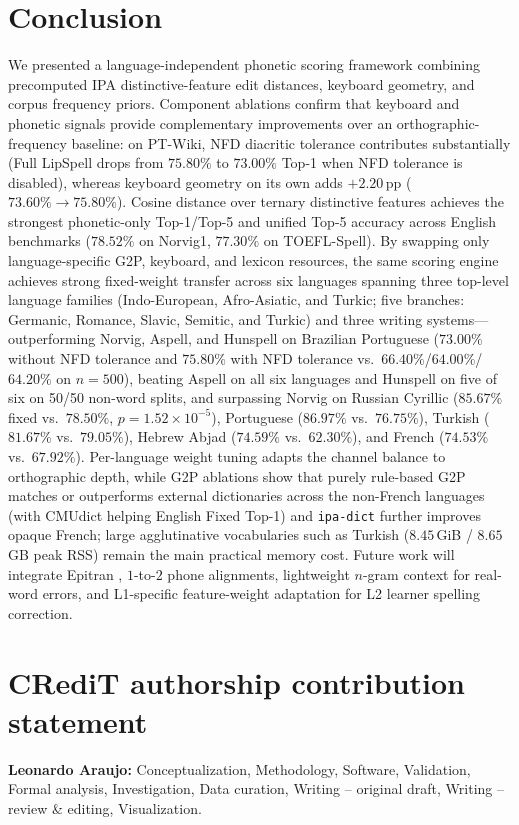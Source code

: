 \documentclass[preprint,12pt,authoryear]{elsarticle}
\begin{document}
\section{Conclusion}
\label{sec:conclusion}
We presented a language-independent phonetic scoring framework combining precomputed IPA distinctive-feature edit distances, keyboard geometry, and corpus frequency priors. Component ablations confirm that keyboard and phonetic signals provide complementary improvements over an orthographic-frequency baseline: on PT-Wiki, NFD diacritic tolerance contributes substantially (Full LipSpell drops from $75.80\%$ to $73.00\%$ Top-1 when NFD tolerance is disabled), whereas keyboard geometry on its own adds $+2.20$\,pp ($73.60\% \rightarrow 75.80\%$). Cosine distance over ternary distinctive features achieves the strongest phonetic-only Top-1/Top-5 and unified Top-5 accuracy across English benchmarks ($78.52\%$ on Norvig1, $77.30\%$ on TOEFL-Spell). By swapping only language-specific G2P, keyboard, and lexicon resources, the same scoring engine achieves strong fixed-weight transfer across six languages spanning three top-level language families (Indo-European, Afro-Asiatic, and Turkic; five branches: Germanic, Romance, Slavic, Semitic, and Turkic) and three writing systems---outperforming Norvig, Aspell, and Hunspell on Brazilian Portuguese ($73.00\%$ without NFD tolerance and $75.80\%$ with NFD tolerance vs.\ $66.40\%$/$64.00\%$/$64.20\%$ on $n=500$), beating Aspell on all six languages and Hunspell on five of six on 50/50 non-word splits, and surpassing Norvig on Russian Cyrillic ($85.67\%$ fixed vs.\ $78.50\%$, $p=1.52\times 10^{-5}$), Portuguese ($86.97\%$ vs.\ $76.75\%$), Turkish ($81.67\%$ vs.\ $79.05\%$), Hebrew Abjad ($74.59\%$ vs.\ $62.30\%$), and French ($74.53\%$ vs.\ $67.92\%$). Per-language weight tuning adapts the channel balance to orthographic depth, while G2P ablations show that purely rule-based G2P matches or outperforms external dictionaries across the non-French languages (with CMUdict helping English Fixed Top-1) and \texttt{ipa-dict} further improves opaque French; large agglutinative vocabularies such as Turkish ($8.45$\,GiB / $8.65$\,GB peak RSS) remain the main practical memory cost. Future work will integrate Epitran \citep{mortensen2018epitran}, $1$-to-$2$ phone alignments, lightweight $n$-gram context for real-word errors, and L1-specific feature-weight adaptation for L2 learner spelling correction.

\section*{CRediT authorship contribution statement}
\textbf{Leonardo Araujo:} Conceptualization, Methodology, Software, Validation, Formal analysis, Investigation, Data curation, Writing -- original draft, Writing -- review \& editing, Visualization.
\end{document}
